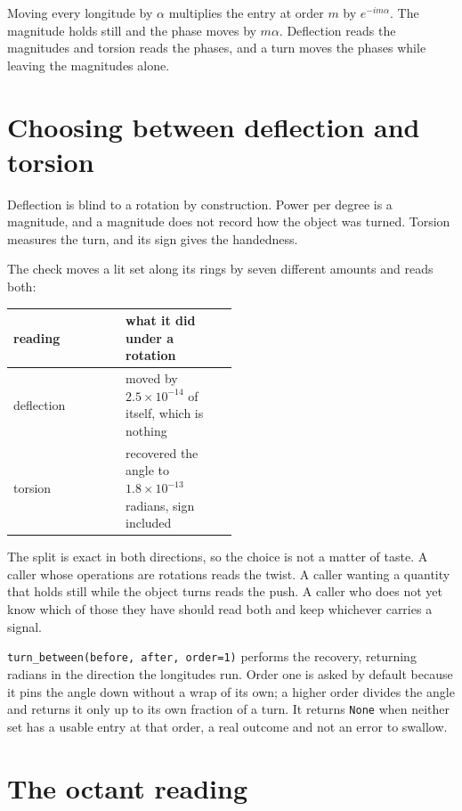 Moving every longitude by \(\alpha\) multiplies the entry at order \(m\) by \(e^{-i m \alpha}\). The magnitude holds still and the phase moves by \(m\alpha\). Deflection reads the magnitudes and torsion reads the phases, and a turn moves the phases while leaving the magnitudes alone.

\section{Choosing between deflection and torsion}

Deflection is blind to a rotation by construction. Power per degree is a magnitude, and a magnitude does not record how the object was turned. Torsion measures the turn, and its sign gives the handedness.

The check moves a lit set along its rings by seven different amounts and reads both:

\begin{center}
\begin{tabular}{@{}lp{0.5\linewidth}@{}}
\toprule
reading & what it did under a rotation \\
\midrule
deflection & moved by \(2.5 \times 10^{-14}\) of itself, which is nothing \\
torsion & recovered the angle to \(1.8 \times 10^{-13}\) radians, sign included \\
\bottomrule
\end{tabular}
\end{center}

The split is exact in both directions, so the choice is not a matter of taste. A caller whose operations are rotations reads the twist. A caller wanting a quantity that holds still while the object turns reads the push. A caller who does not yet know which of those they have should read both and keep whichever carries a signal.

\texttt{turn\_between(before, after, order=1)} performs the recovery, returning radians in the direction the longitudes run. Order one is asked by default because it pins the angle down without a wrap of its own; a higher order divides the angle and returns it only up to its own fraction of a turn. It returns \texttt{None} when neither set has a usable entry at that order, a real outcome and not an error to swallow.

\section{The octant reading}

